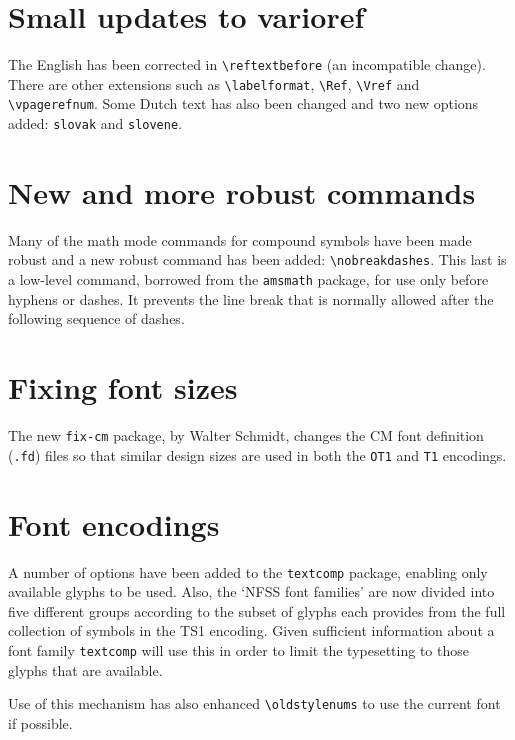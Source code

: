 \documentclass{ltnews}
\providecommand\pkg[1]{\texttt{#1}}
\providecommand\option[1]{\texttt{#1}}
\begin{document}
\section{Small updates to varioref}

The English has been corrected in \verb|\reftextbefore|
(an incompatible change).  There are other extensions
such as \verb|\labelformat|, \verb|\Ref|, \verb|\Vref| and \verb|\vpagerefnum|.
Some Dutch text has also been changed and two\newline
new options added: \option{slovak} and \option{slovene}.


\section{New and more robust commands}

Many of the math mode commands for compound symbols have been made
robust and a new robust command has been added: \verb|\nobreakdashes|.
This last is a low-level command, borrowed from the \pkg{amsmath}
package, for use only before hyphens or dashes.  It prevents the line
break that is normally allowed\newline
after the following sequence of dashes.


\section{Fixing font sizes}

The new \pkg{fix-cm} package, by Walter Schmidt, changes the CM font
definition (\texttt{.fd}) files so that similar design sizes are used
in both the \texttt{OT1} and \texttt{T1} encodings.


\section{Font encodings}

A number of options have been added to the \pkg{textcomp} package,
enabling only available glyphs to be used.
Also, the `NFSS font families' are now divided into five different groups
according to the subset of glyphs each provides from the full
collection of symbols in the TS1 encoding.
Given sufficient information about a font family
\pkg{textcomp} will use this in order to limit the\newline
typesetting to those glyphs that are available.

Use of this mechanism has also enhanced \verb|\oldstylenums|
to use the current font if possible.
\end{document}
